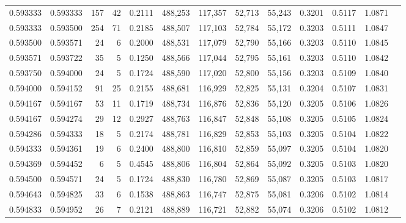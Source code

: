 \begin{tabular}{rrrrrrrrrrrrr}
0.593333 & 0.593333 &   157 &  42 &                                     0.2111 & 488,253 & 117,357 &  52,713 &  55,243 & 0.3201 & 0.5117 & 1.0871 \\
0.593333 & 0.593500 &   254 &  71 &                                     0.2185 & 488,507 & 117,103 &  52,784 &  55,172 & 0.3203 & 0.5111 & 1.0847 \\
0.593500 & 0.593571 &    24 &   6 &                                     0.2000 & 488,531 & 117,079 &  52,790 &  55,166 & 0.3203 & 0.5110 & 1.0845 \\
0.593571 & 0.593722 &    35 &   5 &                                     0.1250 & 488,566 & 117,044 &  52,795 &  55,161 & 0.3203 & 0.5110 & 1.0842 \\
0.593750 & 0.594000 &    24 &   5 &                                     0.1724 & 488,590 & 117,020 &  52,800 &  55,156 & 0.3203 & 0.5109 & 1.0840 \\
0.594000 & 0.594152 &    91 &  25 &                                     0.2155 & 488,681 & 116,929 &  52,825 &  55,131 & 0.3204 & 0.5107 & 1.0831 \\
0.594167 & 0.594167 &    53 &  11 &                                     0.1719 & 488,734 & 116,876 &  52,836 &  55,120 & 0.3205 & 0.5106 & 1.0826 \\
0.594167 & 0.594274 &    29 &  12 &                                     0.2927 & 488,763 & 116,847 &  52,848 &  55,108 & 0.3205 & 0.5105 & 1.0824 \\
0.594286 & 0.594333 &    18 &   5 &                                     0.2174 & 488,781 & 116,829 &  52,853 &  55,103 & 0.3205 & 0.5104 & 1.0822 \\
0.594333 & 0.594361 &    19 &   6 &                                     0.2400 & 488,800 & 116,810 &  52,859 &  55,097 & 0.3205 & 0.5104 & 1.0820 \\
0.594369 & 0.594452 &     6 &   5 &                                     0.4545 & 488,806 & 116,804 &  52,864 &  55,092 & 0.3205 & 0.5103 & 1.0820 \\
0.594500 & 0.594571 &    24 &   5 &                                     0.1724 & 488,830 & 116,780 &  52,869 &  55,087 & 0.3205 & 0.5103 & 1.0817 \\
0.594643 & 0.594825 &    33 &   6 &                                     0.1538 & 488,863 & 116,747 &  52,875 &  55,081 & 0.3206 & 0.5102 & 1.0814 \\
0.594833 & 0.594952 &    26 &   7 &                                     0.2121 & 488,889 & 116,721 &  52,882 &  55,074 & 0.3206 & 0.5102 & 1.0812 \\

\end{tabular}
